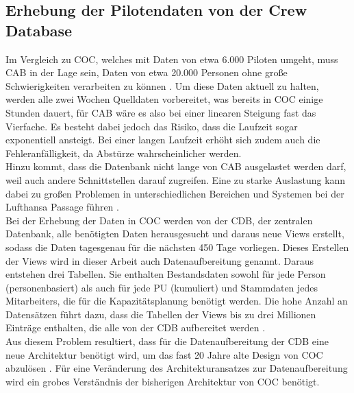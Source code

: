 \documentclass [12pt, a4paper, oneside, titlepage, ngerman]{article}
\begin{document}
\subsection{Erhebung der Pilotendaten von der Crew Database} \label{cdberhebung}
Im Vergleich zu \ac{COC}, welches mit Daten von etwa 6.000 Piloten umgeht, muss \ac{CAB} in der Lage sein, Daten von etwa 20.000 Personen ohne große Schwierigkeiten verarbeiten zu können \cite[vgl.][]{Gespraech1}. Um diese Daten aktuell zu halten, werden alle zwei Wochen Quelldaten vorbereitet, was bereits in \ac{COC} einige Stunden dauert, für \ac{CAB} wäre es also bei einer linearen Steigung fast das Vierfache. Es besteht dabei jedoch das Risiko, dass die Laufzeit sogar exponentiell ansteigt. Bei einer langen Laufzeit erhöht sich zudem auch die Fehleranfälligkeit, da Abstürze wahrscheinlicher werden. \\
Hinzu kommt, dass die Datenbank nicht lange von \ac{CAB} ausgelastet werden darf, weil auch andere Schnittstellen darauf zugreifen. Eine zu starke Auslastung kann dabei zu großen Problemen in unterschiedlichen Bereichen und Systemen bei der Lufthansa Passage führen \cite[vgl.][]{Gespraech1}. \\

\noindent Bei der Erhebung der Daten in \ac{COC} werden von der \ac{CDB}, der zentralen Datenbank, alle benötigten Daten herausgesucht und daraus neue Views erstellt, sodass die Daten tagesgenau für die nächsten 450 Tage vorliegen. Dieses Erstellen der Views wird in dieser Arbeit auch Datenaufbereitung genannt. Daraus entstehen drei Tabellen. Sie enthalten Bestandsdaten sowohl für jede Person (personenbasiert) als auch für jede PU (kumuliert) und Stammdaten jedes Mitarbeiters, die für die Kapazitätsplanung benötigt werden. Die hohe Anzahl an Datensätzen führt dazu, dass die Tabellen der Views bis zu drei Millionen Einträge enthalten, die alle von der \ac{CDB} aufbereitet werden \cite[vgl.][]{Gespraech3}.  \\

\noindent Aus diesem Problem resultiert, dass für die Datenaufbereitung der \ac{CDB} eine neue Architektur benötigt wird, um das fast 20 Jahre alte Design von \ac{COC} abzulösen \cite[vgl.][]{Gespraech3}. Für eine Veränderung des Architekturansatzes zur Datenaufbereitung wird ein grobes Verständnis der bisherigen Architektur von \ac{COC} benötigt.
\end{document}
